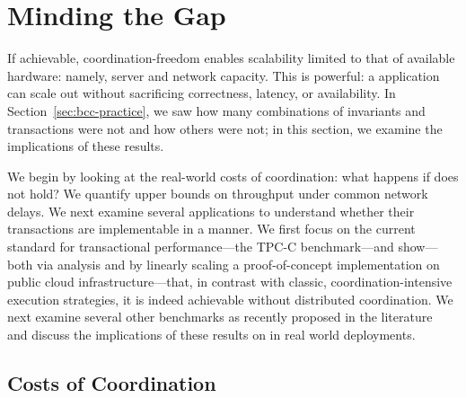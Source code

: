 
\section{Minding the Gap}
\label{sec:evaluation}

If achievable, coordination-freedom enables scalability limited to
that of available hardware: namely, server and network capacity. This
is powerful: a \cfree application can scale out without sacrificing
correctness, latency, or availability. In
Section~\ref{sec:bcc-practice}, we saw how many combinations of
invariants and transactions were not \iconfluent and how others were
not; in this section, we examine the implications of these results.

We begin by looking at the real-world costs of coordination: what
happens if \iconfluence does not hold? We quantify upper bounds on
throughput under common network delays. We next examine several
applications to understand whether their transactions are
implementable in a \cfree manner. We first focus on the current
standard for transactional performance---the TPC-C benchmark---and
show---both via \iconfluence analysis and by linearly scaling a
proof-of-concept implementation on public cloud infrastructure---that,
in contrast with classic, coordination-intensive execution strategies,
it is indeed achievable without distributed coordination. We next
examine several other benchmarks as recently proposed in the
literature~\cite{oltpbench} and discuss the implications of these
results on \cfreedom in real world deployments.

\subsection{Costs of Coordination}

